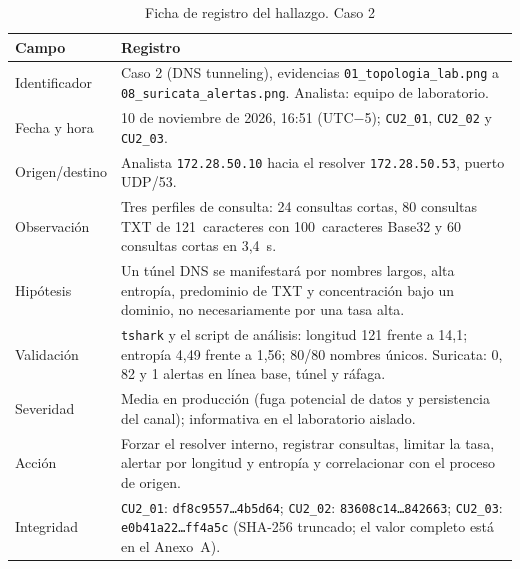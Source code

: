 \begin{table}[H]
	\centering
	\caption{Ficha de registro del hallazgo. Caso 2}
	\footnotesize
	\renewcommand{\arraystretch}{1.2}
	\begin{tabularx}{\textwidth}{@{}>{\raggedright\arraybackslash}p{} Y@{}}
		\toprule
		\textbf{Campo} & \textbf{Registro} \\ \midrule
		Identificador & Caso 2 (DNS tunneling), evidencias \texttt{01\_topologia\_lab.png} a \texttt{08\_suricata\_alertas.png}. Analista: equipo de laboratorio. \\ \hline
		Fecha y hora & 10 de noviembre de 2026, 16:51 (UTC$-$5); \texttt{CU2\_01}, \texttt{CU2\_02} y \texttt{CU2\_03}. \\ \hline
		Origen/destino & Analista \texttt{172.28.50.10} hacia el resolver \texttt{172.28.50.53}, puerto UDP/53. \\ \hline
		Observación & Tres perfiles de consulta: 24 consultas cortas, 80 consultas TXT de 121~caracteres con 100~caracteres Base32 y 60 consultas cortas en 3,4~s. \\ \hline
		Hipótesis & Un túnel DNS se manifestará por nombres largos, alta entropía, predominio de TXT y concentración bajo un dominio, no necesariamente por una tasa alta. \\ \hline
		Validación & \texttt{tshark} y el script de análisis: longitud 121 frente a 14,1; entropía 4,49 frente a 1,56; 80/80 nombres únicos. Suricata: 0, 82 y 1 alertas en línea base, túnel y ráfaga. \\ \hline
		Severidad & Media en producción (fuga potencial de datos y persistencia del canal); informativa en el laboratorio aislado. \\ \hline
		Acción & Forzar el resolver interno, registrar consultas, limitar la tasa, alertar por longitud y entropía y correlacionar con el proceso de origen. \\ \hline
		Integridad & \texttt{CU2\_01}: \texttt{df8c9557\dots4b5d64}; \texttt{CU2\_02}: \texttt{83608c14\dots842663}; \texttt{CU2\_03}: \texttt{e0b41a22\dots{}ff4a5c} (SHA-256 truncado; el valor completo está en el Anexo~A). \\
		\bottomrule
	\end{tabularx}
\end{table}
